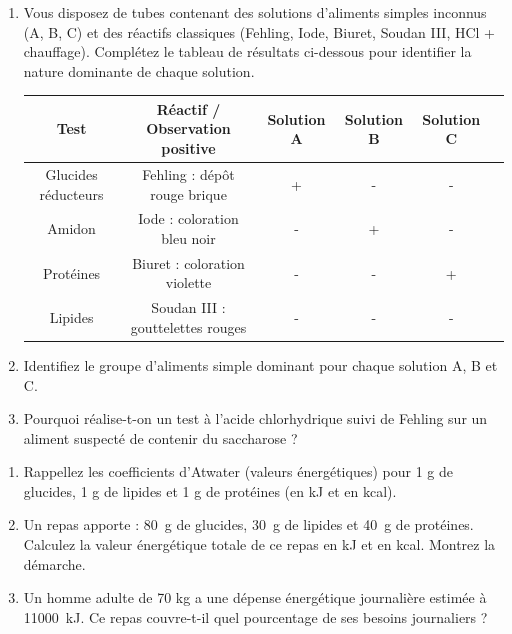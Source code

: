 \documentclass[11pt]{article}
\begin{document}
\begin{exercice}
\begin{enumerate}
    \item Vous disposez de tubes contenant des solutions d'aliments simples inconnus (A, B, C) et des réactifs classiques (Fehling, Iode, Biuret, Soudan III, HCl + chauffage). Complétez le tableau de résultats ci-dessous pour identifier la nature dominante de chaque solution.
    \begin{tabular}{|c|c|c|c|c|c|}
    \hline
    \textbf{Test} & \textbf{Réactif / Observation positive} & \textbf{Solution A} & \textbf{Solution B} & \textbf{Solution C} \\
    \hline
    Glucides réducteurs & Fehling : dépôt rouge brique & + & - & - \\
    \hline
    Amidon & Iode : coloration bleu noir & - & + & - \\
    \hline
    Protéines & Biuret : coloration violette & - & - & + \\
    \hline
    Lipides & Soudan III : gouttelettes rouges & - & - & - \\
    \hline
    \end{tabular}
    \item Identifiez le groupe d'aliments simple dominant pour chaque solution A, B et C.
    \item Pourquoi réalise-t-on un test à l'acide chlorhydrique suivi de Fehling sur un aliment suspecté de contenir du saccharose ?
\end{enumerate}
\end{exercice}

\begin{exercice}
\begin{enumerate}
    \item Rappellez les coefficients d'Atwater (valeurs énergétiques) pour 1 g de glucides, 1 g de lipides et 1 g de protéines (en kJ et en kcal).
    \item Un repas apporte : \SI{80}{g} de glucides, \SI{30}{g} de lipides et \SI{40}{g} de protéines. Calculez la valeur énergétique totale de ce repas en kJ et en kcal. Montrez la démarche.
    \item Un homme adulte de 70 kg a une dépense énergétique journalière estimée à \SI{11000}{kJ}. Ce repas couvre-t-il quel pourcentage de ses besoins journaliers ?
\end{enumerate}
\end{exercice}
\end{document}
